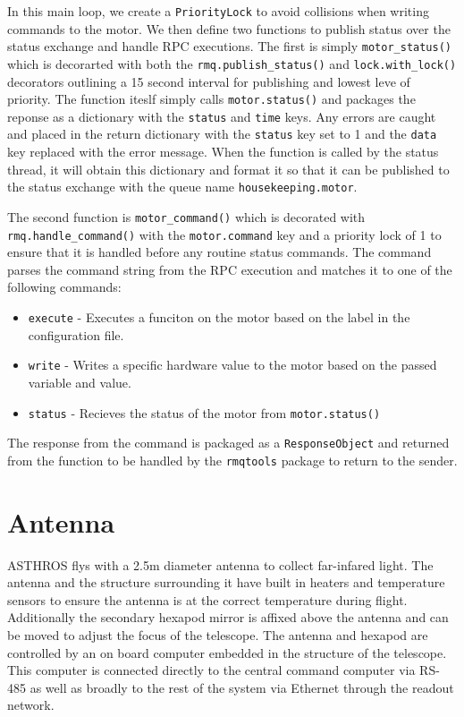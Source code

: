In this main loop, we create a \texttt{PriorityLock} to avoid collisions when writing commands to the motor. 
We then define two functions to publish status over the status exchange and handle RPC executions.
The first is simply \texttt{motor\_status()} which is decorarted with both the \texttt{rmq.publish\_status()} and \texttt{lock.with\_lock()} decorators outlining a 15 second interval for publishing and lowest leve of priority.
The function iteslf simply calls \texttt{motor.status()} and packages the reponse as a dictionary with the \texttt{status} and \texttt{time} keys.
Any errors are caught and placed in the return dictionary with the \texttt{status} key set to 1 and the \texttt{data} key replaced with the error message.
When the function is called by the status thread, it will obtain this dictionary and format it so that it can be published to the status exchange with the queue name \texttt{housekeeping.motor}.

The second function is \texttt{motor\_command()} which is decorated with \texttt{rmq.handle\_command()} with the \texttt{motor.command} key and a priority lock of 1 to ensure that it is handled before any routine status commands.
The command parses the command string from the RPC execution and matches it to one of the following commands:
\begin{itemize}
    \item \texttt{execute} - Executes a funciton on the motor based on the label in the configuration file. 
    \item \texttt{write} - Writes a specific hardware value to the motor based on the passed variable and value.
    \item \texttt{status} - Recieves the status of the motor from \texttt{motor.status()}
\end{itemize}
The response from the command is packaged as a \texttt{ResponseObject} and returned from the function to be handled by the \texttt{rmqtools} package to return to the sender. 

\section{Antenna}
ASTHROS flys with a 2.5m diameter antenna to collect far-infared light. 
The antenna and the structure surrounding it have built in heaters and temperature sensors to ensure the antenna is at the correct temperature during flight.
Additionally the secondary hexapod mirror is affixed above the antenna and can be moved to adjust the focus of the telescope.
The antenna and hexapod are controlled by an on board computer embedded in the structure of the telescope.
This computer is connected directly to the central command computer via RS-485 as well as broadly to the rest of the system via Ethernet through the readout network.

